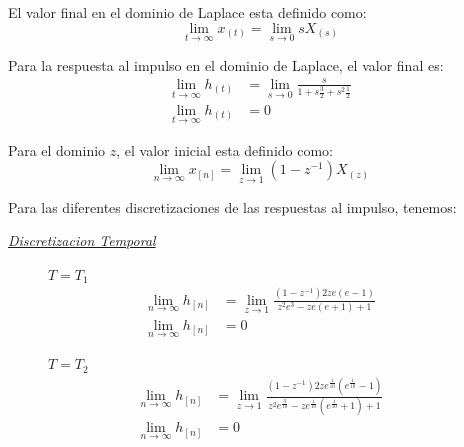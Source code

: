 \documentclass[a4paper,12pt]{report}
\begin{document}
\begin{enumerate}[label=\alph*), left=0pt]
                El valor final en el dominio de Laplace esta definido como:
                \begin{equation}
                    \label{tvf.laplace}
                    \lim_{t \to \infty} x_{(t)} = \lim_{s \to 0} s X_{(s)}
                \end{equation}

                Para la respuesta al impulso en el dominio de Laplace, el valor final es:
                \begin{align*}
                    \lim_{t \to \infty} h_{(t)} &= \lim_{s \to 0} \frac{s}{1 + s \frac{3}{2} + s^2 \frac{1}{2}}\\
                    \lim_{t \to \infty} h_{(t)} &= 0
                \end{align*}

                Para el dominio $z$, el valor inicial esta definido como:
                \begin{equation}
                    \label{tvf.zeta}
                    \lim_{n \to \infty} x_{[n]} = \lim_{z \to 1} \left(1 - z^{-1}\right) X_{(z)}
                \end{equation}

                Para las diferentes discretizaciones de las respuestas al impulso, tenemos:

                {\centering\underline{\textit{Discretizacion Temporal}}\par}
                \begin{figure}[h!]
                    \centering
                    \begin{minipage}{0.4\textwidth}
                        \centering
                        $T = T_1$
                        \begin{align*}
                            \lim_{n \to \infty} h_{[n]} &= \lim_{z \to 1}  \frac{\left(1 - z^{-1}\right) 2 z e (e - 1)}
                                {z^2 e^3 - z e (e + 1) + 1}\\
                            \lim_{n \to \infty} h_{[n]} &= 0
                        \end{align*}
                    \end{minipage}
                    \hspace{0.5cm}
                    \begin{minipage}{0.4\textwidth}
                        \centering
                        $T = T_2$
                        \begin{align*}
                            \lim_{n \to \infty} h_{[n]} &= \lim_{z \to 1} \frac{\left(1 - z^{-1}\right) 2 z e^{\frac{1}
                                {10}} (e^{\frac{1}{10}} - 1)}{z^2 e^{\frac{3}{10}} - z  e^{\frac{1}{10}}(e^{
                                \frac{1}{10}} + 1) + 1}\\
                            \lim_{n \to \infty} h_{[n]} &= 0
                        \end{align*}
                    \end{minipage}
                \end{figure}


\end{enumerate}
\end{document}
